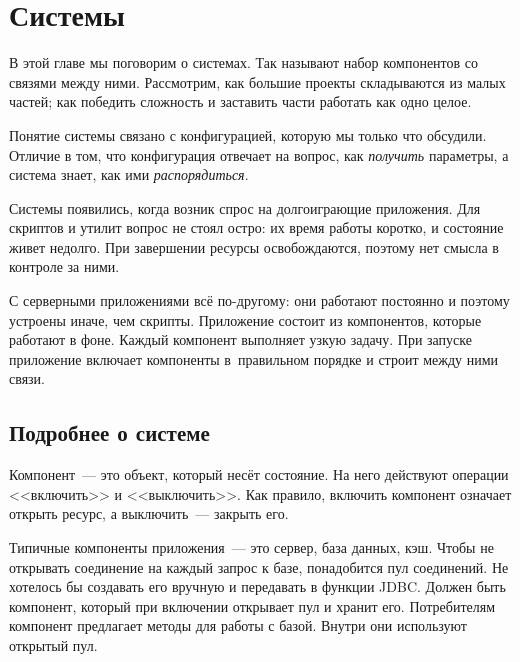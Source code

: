 \chapter{Системы}

\label{chapter-systems}


\begin{teaser}
В этой главе мы поговорим о системах. Так называют набор компонентов со связями
между ними. Рассмотрим, как большие проекты складываются из малых частей; как
победить сложность и заставить части работать как одно целое.
\end{teaser}

Понятие системы связано с конфигурацией, которую мы только что обсудили. Отличие
в том, что конфигурация отвечает на вопрос, как \emph{получить} параметры, а
система знает, как ими \emph{распорядиться}.

Системы появились, когда возник спрос на долгоиграющие приложения. Для скриптов
и утилит вопрос не стоял остро: их время работы коротко, и состояние живет
недолго. При завершении ресурсы освобождаются, поэтому нет смысла в контроле за
ними.

С серверными приложениями всё по-дру\-го\-му: они работают постоянно и поэтому
устроены иначе, чем скрипты. Приложение состоит из компонентов, которые работают
в фоне. Каждый компонент выполняет узкую задачу. При запуске приложение включает
компоненты в~правильном порядке и строит между ними связи.

\section{Подробнее о системе}


Компонент~--- это объект, который несёт состояние. На него действуют операции
<<включить>> и <<выключить>>. Как правило, включить компонент означает открыть
ресурс, а выключить~--- закрыть его.


Типичные компоненты приложения~--- это сервер, база данных, кэш. Чтобы не открывать
соединение на каждый запрос к базе, понадобится пул соединений. Не хотелось бы
создавать его вручную и передавать в функции JDBC. Должен быть компонент,
который при включении открывает пул и хранит его. Потребителям компонент
предлагает методы для работы с базой. Внутри они используют открытый пул.


